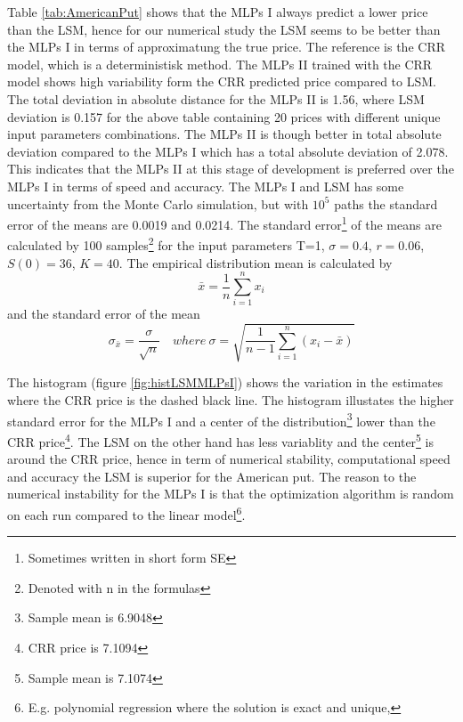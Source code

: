 Table \ref{tab:AmericanPut} shows that the MLPs I always predict a lower price than the LSM, hence for our numerical study the LSM seems to be better than the MLPs I in terms of approximatung the true price. The reference is the CRR model, which is a deterministisk method. The MLPs II trained with the CRR model shows high variability form the CRR predicted price compared to LSM. The total deviation in absolute distance for the MLPs II is 1.56, where LSM deviation is 0.157 for the above table containing 20 prices with different unique input parameters combinations. The MLPs II is though better in total absolute deviation compared to the MLPs I which has a total absolute deviation of 2.078. This indicates that the MLPs II at this stage of development is preferred over the MLPs I in terms of speed and accuracy. The MLPs I and LSM has some uncertainty from the Monte Carlo simulation, but with $10^5$ paths the standard error of the means are 0.0019 and 0.0214. The standard error\footnote{Sometimes written in short form SE} of the means are calculated by 100 samples\footnote{Denoted with n in the formulas} for the input parameters T=1, $\sigma=0.4$, $r=0.06$, $S(0)=36$, $K=40$. The empirical distribution mean is calculated by
$$\bar{x}= \frac{1}{n}\sum_{i=1}^{n} x_i$$
and the standard error of the mean
$$\sigma_{\bar{x}}= \frac{\sigma}{\sqrt{n}} \quad where \ \sigma=\sqrt{\frac{1}{n-1}\sum_{i=1}^{n} (x_i-\bar{x})}$$
 
The histogram (figure \ref{fig:histLSMMLPsI}) shows the variation in the estimates where the CRR price is the dashed black line. The histogram illustates the higher standard error for the MLPs I and a center of the distribution\footnote{Sample mean is 6.9048} lower than the CRR price\footnote{CRR price is 7.1094}. The LSM on the other hand has less variablity and the center\footnote{Sample mean is 7.1074} is around the CRR price, hence in term of numerical stability, computational speed and accuracy the LSM is superior for the American put. The reason to the numerical instability for the MLPs I is that the optimization algorithm is random on each run compared to the linear model\footnote{E.g. polynomial regression where the solution is exact and unique,}.\\

